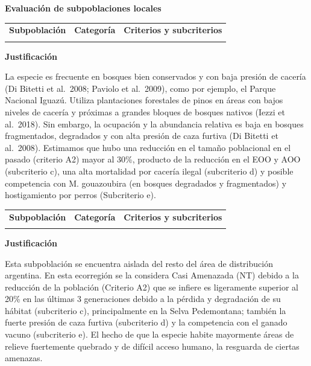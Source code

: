 \documentclass[
  x11names]{article}
\begin{document}
\textbf{Evaluación de subpoblaciones locales}

\begin{tabu} to 
\toprule
\textbf{Subpoblación} & \textbf{Categoría} & \textbf{Criterios y subcriterios}\\
\midrule
{} &  & \\
\bottomrule
\end{tabu}

\textbf{Justificación}

La especie es frecuente en bosques bien conservados y con baja presión
de cacería (Di Bitetti et al.~2008; Paviolo et al.~2009), como por
ejemplo, el Parque Nacional Iguazú. Utiliza plantaciones forestales de
pinos en áreas con bajos niveles de cacería y próximas a grandes bloques
de bosques nativos (Iezzi et al.~2018). Sin embargo, la ocupación y la
abundancia relativa es baja en bosques fragmentados, degradados y con
alta presión de caza furtiva (Di Bitetti et al.~2008). Estimamos que
hubo una reducción en el tamaño poblacional en el pasado (criterio A2)
mayor al 30\%, producto de la reducción en el EOO y AOO (subcriterio c),
una alta mortalidad por cacería ilegal (subcriterio d) y posible
competencia con M. gouazoubira (en bosques degradados y fragmentados) y
hostigamiento por perros (Subcriterio e).\vspace{0.5cm}

\begin{tabu} to 
\toprule
\textbf{Subpoblación} & \textbf{Categoría} & \textbf{Criterios y subcriterios}\\
\midrule
{} &  & \\
\bottomrule
\end{tabu}

\textbf{Justificación}

Esta subpoblación se encuentra aislada del resto del área de
distribución argentina. En esta ecorregión se la considera Casi
Amenazada (NT) debido a la reducción de la población (Criterio A2) que
se infiere es ligeramente superior al 20\% en las últimas 3 generaciones
debido a la pérdida y degradación de su hábitat (subcriterio c),
principalmente en la Selva Pedemontana; también la fuerte presión de
caza furtiva (subcriterio d) y la competencia con el ganado vacuno
(subcriterio e). El hecho de que la especie habite mayormente áreas de
relieve fuertemente quebrado y de difícil acceso humano, la resguarda de
ciertas amenazas.\vspace{0.5cm}
\end{document}
